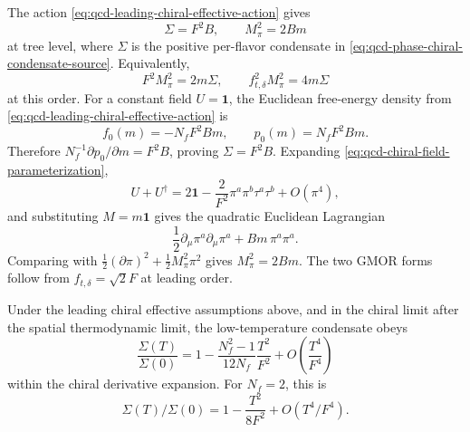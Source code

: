 \begin{remark}
\label{prop:qcd-chiral-effective-source-normalization}
The action \eqref{eq:qcd-leading-chiral-effective-action} gives
\begin{equation}
  \Sigma=F^2B,
  \qquad
  M_\pi^2=2Bm
  \label{eq:qcd-chiral-sigma-mpi-tree}
\end{equation}
at tree level, where \(\Sigma\) is the positive per-flavor condensate in
\eqref{eq:qcd-phase-chiral-condensate-source}.  Equivalently,
\[
  F^2M_\pi^2=2m\Sigma,
  \qquad
  f_{t,\delta}^2M_\pi^2=4m\Sigma
\]
at this order.
For a constant field \(U=\mathbf1\), the Euclidean free-energy density from
\eqref{eq:qcd-leading-chiral-effective-action} is
\[
  f_0(m)=-N_fF^2Bm,
  \qquad
  p_0(m)=N_fF^2Bm .
\]
Therefore \(N_f^{-1}\partial p_0/\partial m=F^2B\), proving
\(\Sigma=F^2B\).  Expanding
\eqref{eq:qcd-chiral-field-parameterization},
\[
  U+U^\dagger
  =
  2\mathbf1-\frac{2}{F^2}\pi^a\pi^b\tau^a\tau^b+O(\pi^4),
\]
and substituting \(M=m\mathbf1\) gives the quadratic Euclidean Lagrangian
\[
  \frac12\partial_\mu\pi^a\partial_\mu\pi^a
  +
  Bm\,\pi^a\pi^a .
\]
Comparing with
\(\frac12(\partial\pi)^2+\frac12M_\pi^2\pi^2\) gives
\(M_\pi^2=2Bm\).  The two GMOR forms follow from
\(f_{t,\delta}=\sqrt2F\) at leading order.
\end{remark}

\begin{lemma}
\label{lem:qcd-low-temperature-chiral-condensate}
Under the leading chiral effective assumptions above, and in the chiral limit
after the spatial thermodynamic limit, the low-temperature condensate obeys
\begin{equation}
  \frac{\Sigma(T)}{\Sigma(0)}
  =
  1-\frac{N_f^2-1}{12N_f}\frac{T^2}{F^2}
  +O\!\left(\frac{T^4}{F^4}\right)
  \label{eq:qcd-low-temperature-chiral-condensate}
\end{equation}
within the chiral derivative expansion.  For \(N_f=2\), this is
\[
  \Sigma(T)/\Sigma(0)=1-\frac{T^2}{8F^2}+O(T^4/F^4).
\]
\end{lemma}

